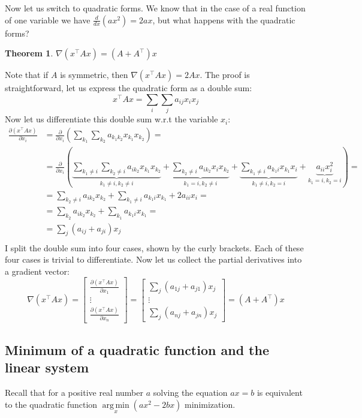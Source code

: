 \documentclass[notitlepage]{report}
\DeclareMathOperator*{\argmin}{arg\,min}
\newtheorem{theorem}{Theorem}
\begin{document}
Now let us switch to quadratic forms.
We know that in the case of a real function of one variable we have $\frac{d}{dx}(ax^2) = 2ax$, but what happens with the quadratic forms?
\begin{theorem}
$\nabla (x^\top A x) = (A+A^\top)x$
\end{theorem}
Note that if $A$ is symmetric, then $\nabla (x^\top A x) = 2Ax$.
The proof is straightforward, let us express the quadratic form as a double sum:
$$x^\top A x = \sum\limits_i\sum\limits_j a_{ij} x_i x_j$$
Now let us differentiate this double sum w.r.t the variable $x_i$:
\begin{align*}
\frac{\partial (x^\top A x)}{\partial x_i} 
&= \frac{\partial}{\partial x_i}  \left(\sum\limits_{k_1}\sum\limits_{k_2} a_{k_1 k_2} x_{k_1} x_{k_2}\right) = \\
&= \frac{\partial}{\partial x_i}  \left(
\underbrace{\sum\limits_{k_1\neq i}\sum\limits_{k_2\neq i} a_{ik_2}x_{k_1} x_{k_2}}_{k_1 \neq i, k_2 \neq i}+\underbrace{\sum\limits_{k_2\neq i} a_{ik_2}x_i x_{k_2}}_{k_1 = i, k_2\neq i}+
\underbrace{\sum\limits_{k_1\neq i} a_{k_1 i} x_{k_1} x_i}_{k_1 \neq i, k_2 = i}+
\underbrace{a_{ii}x_i^2}_{k_1 = i, k_2 = i}\right) = \\
& = \sum\limits_{k_2\neq i} a_{ik_2}x_{k_2} + \sum\limits_{k_1\neq i} a_{k_1 i} x_{k_1} + 2 a_{ii} x_i = \\
& = \sum\limits_{k_2} a_{ik_2}x_{k_2} + \sum\limits_{k_1} a_{k_1 i} x_{k_1} = \\
& = \sum\limits_{j} (a_{ij} + a_{ji}) x_j \\
\end{align*}
I split the double sum into four cases, shown by the curly brackets.
Each of these four cases is trivial to differentiate. 
Now let us collect the partial derivatives  into a gradient vector:
$$\nabla(x^\top A x) = \begin{bmatrix}\frac{\partial (x^\top Ax)}{\partial x_1} \\ \vdots \\ \frac{\partial (x^\top A x)}{\partial x_n} \end{bmatrix}  = \begin{bmatrix}\sum\limits_{j} (a_{1j} + a_{j1}) x_j \\ \vdots \\ \sum\limits_{j} (a_{nj} + a_{jn}) x_j \end{bmatrix}  = (A+A^\top)x
$$

\subsection{Minimum of a quadratic function and the linear system}
Recall that for a positive real number $a$ solving the equation
$ax=b$ is equivalent to the quadratic function $\argmin\limits_x(ax^2 - 2bx)$ minimization.
\end{document}
